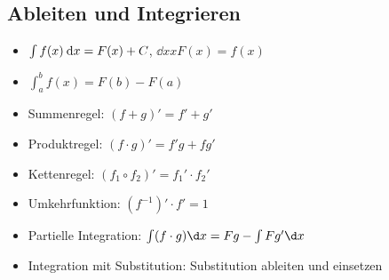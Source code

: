 \documentclass[a4paper,10pt]{article}
\begin{document}
\begin{multicols}{2}
\section {Ableiten und Integrieren}
\begin{itemize}
\item $\int f(x) \:\mathrm{d}{x} = F(x) +C$, $\dd{x}{x} F(x) = f(x)$
\item $\int_a^b f(x) = F(b) - F(a)$
\item Summenregel: $(f+g)' = f'+g'$
\item Produktregel: $(f\cdot g)' = f'g+fg'$
\item Kettenregel: $(f_1\circ f_2)' = f_1' \cdot f_2'$
\item Umkehrfunktion: $(f^{-1})' \cdot f' = 1$
\item Partielle Integration: $\int (f \cdot g) \d x = Fg - \int Fg' \d x$
\item Integration mit Substitution: Substitution ableiten und einsetzen
\end{itemize}

\end{multicols}

\newpage
\noindent
\end{document}
